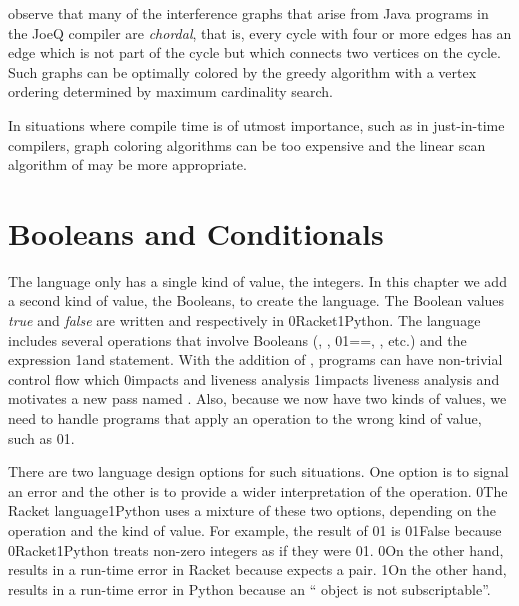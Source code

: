 \documentclass[7x10,nocrop]{TimesAPriori_MIT}%
\def\racketEd{0}
\def\pythonEd{1}
\def\edition{0}
\newcommand{\racket}[1]{{\if\edition\racketEd{#1}\fi}}
\newcommand{\python}[1]{{\if\edition\pythonEd #1\fi}}
\begin{document}


\citet{Palsberg:2007si} observe that many of the interference graphs
that arise from Java programs in the JoeQ compiler are \emph{chordal},
that is, every cycle with four or more edges has an edge which is not
part of the cycle but which connects two vertices on the cycle. Such
graphs can be optimally colored by the greedy algorithm with a vertex
ordering determined by maximum cardinality search.

In situations where compile time is of utmost importance, such as in
just-in-time compilers, graph coloring algorithms can be too expensive
and the linear scan algorithm of \citet{Poletto:1999uq} may be more
appropriate.


\chapter{Booleans and Conditionals}
\label{ch:Lif}

The \LangVar{} language only has a single kind of value, the
integers. In this chapter we add a second kind of value, the Booleans,
to create the \LangIf{} language. The Boolean values \emph{true} and
\emph{false} are written \TRUE{} and \FALSE{} respectively in
\racket{Racket}\python{Python}.  The \LangIf{} language includes
several operations that involve Booleans (, ,
\racket{}\python{==}, \key{<}, etc.) and the 
expression \python{and statement}.  With the addition of ,
programs can have non-trivial control flow which
%
\racket{impacts  and liveness analysis}
%
\python{impacts liveness analysis and motivates a new pass named
  \code{explicate\_control}}.
%
Also, because we now have two kinds of values, we need to handle
programs that apply an operation to the wrong kind of value, such as
\racket{}\python{}.

There are two language design options for such situations.  One option
is to signal an error and the other is to provide a wider
interpretation of the operation. \racket{The Racket
  language}\python{Python} uses a mixture of these two options,
depending on the operation and the kind of value. For example, the
result of \racket{}\python{} is
\racket{}\python{False} because \racket{Racket}\python{Python}
treats non-zero integers as if they were \racket{}\python{}.
%
\racket{On the other hand,  results in a run-time error
  in Racket because \code{car} expects a pair.}
%
\python{On the other hand,  results in a run-time error
  in Python because an ``\code{int} object is not subscriptable''.}
\end{document}
